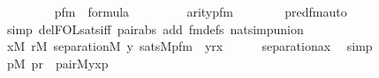 \begin{isabellebody}
\ \ \ \ \isanewline
\ \ \ \ {\isachardoublequoteopen}pfm{\isacharparenleft}{\kern0pt}{}{\isacharcomma}{\kern0pt}{}{\isacharcomma}{\kern0pt}{}{\isacharparenright}{\kern0pt}\ {\isasymin}\ formula{\isachardoublequoteclose}\isanewline
\ \ \ \ \isanewline
\ \ \ \ {\isachardoublequoteopen}arity{\isacharparenleft}{\kern0pt}pfm{\isacharparenleft}{\kern0pt}{}{\isacharcomma}{\kern0pt}{}{\isacharcomma}{\kern0pt}{}{\isacharparenright}{\kern0pt}{\isacharparenright}{\kern0pt}\ {\isacharequal}{\kern0pt}\ {}{\isachardoublequoteclose}\isanewline
\ \ \ \ \isamarkupfalse%
\ pred{\isacharunderscore}{\kern0pt}fm{\isacharunderscore}{\kern0pt}auto\ \isamarkupfalse%
\ {\isacharparenleft}{\kern0pt}simp\ del{\isacharcolon}{\kern0pt}FOL{\isacharunderscore}{\kern0pt}sats{\isacharunderscore}{\kern0pt}iff\ pair{\isacharunderscore}{\kern0pt}abs\ add{\isacharcolon}{\kern0pt}\ fm{\isacharunderscore}{\kern0pt}defs\ nat{\isacharunderscore}{\kern0pt}simp{\isacharunderscore}{\kern0pt}union{\isacharparenright}{\kern0pt}\isanewline
\ \ \isamarkupfalse%
\isanewline
\ \ \isamarkupfalse%
\ {\isachardoublequoteopen}{\isasymforall}x{\isasymin}M{\isachardot}{\kern0pt}\ {\isasymforall}r{\isasymin}M{\isachardot}{\kern0pt}\ separation{\isacharparenleft}{\kern0pt}{\isacharhash}{\kern0pt}{\isacharhash}{\kern0pt}M{\isacharcomma}{\kern0pt}\ {\isasymlambda}y{\isachardot}{\kern0pt}\ sats{\isacharparenleft}{\kern0pt}M{\isacharcomma}{\kern0pt}pfm{\isacharparenleft}{\kern0pt}{}{\isacharcomma}{\kern0pt}{}{\isacharcomma}{\kern0pt}{}{\isacharparenright}{\kern0pt}\ {\isacharcomma}{\kern0pt}\ {\isacharbrackleft}{\kern0pt}y{\isacharcomma}{\kern0pt}r{\isacharcomma}{\kern0pt}x{\isacharbrackright}{\kern0pt}{\isacharparenright}{\kern0pt}{\isacharparenright}{\kern0pt}{\isachardoublequoteclose}\isanewline
\ \ \ \ \isamarkupfalse%
\ separation{\isacharunderscore}{\kern0pt}ax\ \isamarkupfalse%
\ simp\isanewline
\ \ \isamarkupfalse%
\isanewline
\ \ \isamarkupfalse%
\ {\isachardoublequoteopen}{\isacharparenleft}{\kern0pt}{\isasymexists}p{\isasymin}M{\isachardot}{\kern0pt}\ p{\isasymin}r\ {\isacharampersand}{\kern0pt}\ pair{\isacharparenleft}{\kern0pt}{\isacharhash}{\kern0pt}{\isacharhash}{\kern0pt}M{\isacharcomma}{\kern0pt}y{\isacharcomma}{\kern0pt}x{\isacharcomma}{\kern0pt}p{\isacharparenright}{\kern0pt}{\isacharparenright}{\kern0pt}\isanewline

\end{isabellebody}
